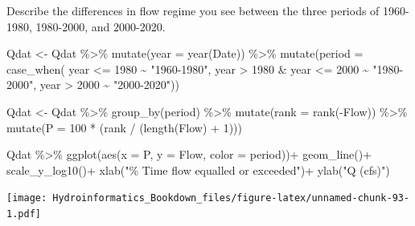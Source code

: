 \documentclass[
]{book}
\newenvironment{Shaded}{\begin{snugshade}}{\end{snugshade}}
\newcommand{\AttributeTok}[1]{\textcolor[rgb]{0.77,0.63,0.00}{#1}}
\newcommand{\DecValTok}[1]{\textcolor[rgb]{0.00,0.00,0.81}{#1}}
\newcommand{\FunctionTok}[1]{\textcolor[rgb]{0.00,0.00,0.00}{#1}}
\newcommand{\NormalTok}[1]{#1}
\newcommand{\OtherTok}[1]{\textcolor[rgb]{0.56,0.35,0.01}{#1}}
\newcommand{\SpecialCharTok}[1]{\textcolor[rgb]{0.00,0.00,0.00}{#1}}
\newcommand{\StringTok}[1]{\textcolor[rgb]{0.31,0.60,0.02}{#1}}
\begin{document}
Describe the differences in flow regime you see between the three periods of 1960-1980, 1980-2000, and 2000-2020.

\begin{Shaded}
\begin{Highlighting}[]
\NormalTok{Qdat }\OtherTok{\textless{}{-}}\NormalTok{ Qdat }\SpecialCharTok{\%\textgreater{}\%}
  \FunctionTok{mutate}\NormalTok{(}\AttributeTok{year =} \FunctionTok{year}\NormalTok{(Date)) }\SpecialCharTok{\%\textgreater{}\%}
  \FunctionTok{mutate}\NormalTok{(}\AttributeTok{period =} \FunctionTok{case\_when}\NormalTok{( year }\SpecialCharTok{\textless{}=} \DecValTok{1980} \SpecialCharTok{\textasciitilde{}} \StringTok{"1960{-}1980"}\NormalTok{,}
\NormalTok{                             year }\SpecialCharTok{\textgreater{}} \DecValTok{1980} \SpecialCharTok{\&}\NormalTok{ year }\SpecialCharTok{\textless{}=} \DecValTok{2000} \SpecialCharTok{\textasciitilde{}} \StringTok{"1980{-}2000"}\NormalTok{,}
\NormalTok{                             year }\SpecialCharTok{\textgreater{}} \DecValTok{2000} \SpecialCharTok{\textasciitilde{}} \StringTok{"2000{-}2020"}\NormalTok{))}

\NormalTok{Qdat }\OtherTok{\textless{}{-}}\NormalTok{ Qdat }\SpecialCharTok{\%\textgreater{}\%}
  \FunctionTok{group\_by}\NormalTok{(period) }\SpecialCharTok{\%\textgreater{}\%}
  \FunctionTok{mutate}\NormalTok{(}\AttributeTok{rank =} \FunctionTok{rank}\NormalTok{(}\SpecialCharTok{{-}}\NormalTok{Flow)) }\SpecialCharTok{\%\textgreater{}\%} 
  \FunctionTok{mutate}\NormalTok{(}\AttributeTok{P =} \DecValTok{100} \SpecialCharTok{*}\NormalTok{ (rank }\SpecialCharTok{/}\NormalTok{ (}\FunctionTok{length}\NormalTok{(Flow) }\SpecialCharTok{+} \DecValTok{1}\NormalTok{)))}

\NormalTok{Qdat }\SpecialCharTok{\%\textgreater{}\%} \FunctionTok{ggplot}\NormalTok{(}\FunctionTok{aes}\NormalTok{(}\AttributeTok{x =}\NormalTok{ P, }\AttributeTok{y =}\NormalTok{ Flow, }\AttributeTok{color =}\NormalTok{ period))}\SpecialCharTok{+}
  \FunctionTok{geom\_line}\NormalTok{()}\SpecialCharTok{+}
  \FunctionTok{scale\_y\_log10}\NormalTok{()}\SpecialCharTok{+}
  \FunctionTok{xlab}\NormalTok{(}\StringTok{"\% Time flow equalled or exceeded"}\NormalTok{)}\SpecialCharTok{+}
  \FunctionTok{ylab}\NormalTok{(}\StringTok{"Q (cfs)"}\NormalTok{)}
\end{Highlighting}
\end{Shaded}

\texttt{[image: Hydroinformatics\_Bookdown\_files/figure-latex/unnamed-chunk-93-1.pdf]}
\end{document}
